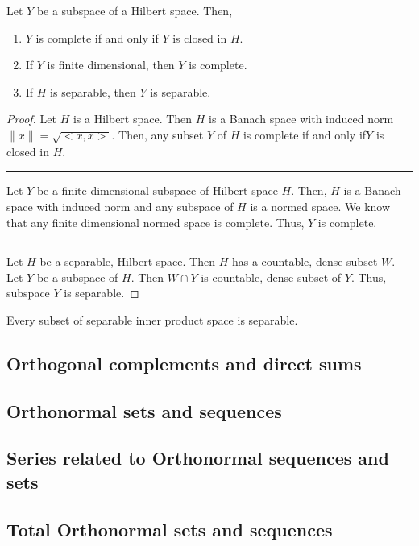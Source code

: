 \begin{theorem}
	Let $Y$ be a subspace of a Hilbert space.
	Then,
	\begin{enumerate}
		\item $Y$ is complete if and only if $Y$ is closed in $H$.
		\item If $Y$ is finite dimensional, then $Y$ is complete.
		\item If $H$ is separable, then $Y$ is separable.
	\end{enumerate}
\end{theorem}
\begin{proof}
	Let $H$ is a Hilbert space.
	Then $H$ is a Banach space with induced norm $\|x\| = \sqrt{<x,x>}$.
	Then, any subset $Y$ of $H$ is complete if and only if$Y$ is closed in $H$.\\

	\hrule \vspace{1em}

	Let $Y$ be a finite dimensional subspace of Hilbert space $H$.
	Then, $H$ is a Banach space with induced norm and any subspace of $H$ is a normed space.
	We know that any finite dimensional normed space is complete.
	Thus, $Y$ is complete.\\

	\hrule \vspace{1em}

	Let $H$ be a separable, Hilbert space.
	Then $H$ has a countable, dense subset $W$.
	Let $Y$ be a subspace of $H$.
	Then $W \cap Y$ is countable, dense subset of $Y$.
	Thus, subspace $Y$ is separable.
\end{proof}

\begin{important}
	Every subset of separable inner product space is separable.
\end{important}

\subsection{Orthogonal complements and direct sums}
\subsection{Orthonormal sets and sequences}
\subsection{Series related to Orthonormal sequences and sets}
\subsection{Total Orthonormal sets and sequences}
\setcounter{subsection}{7}
